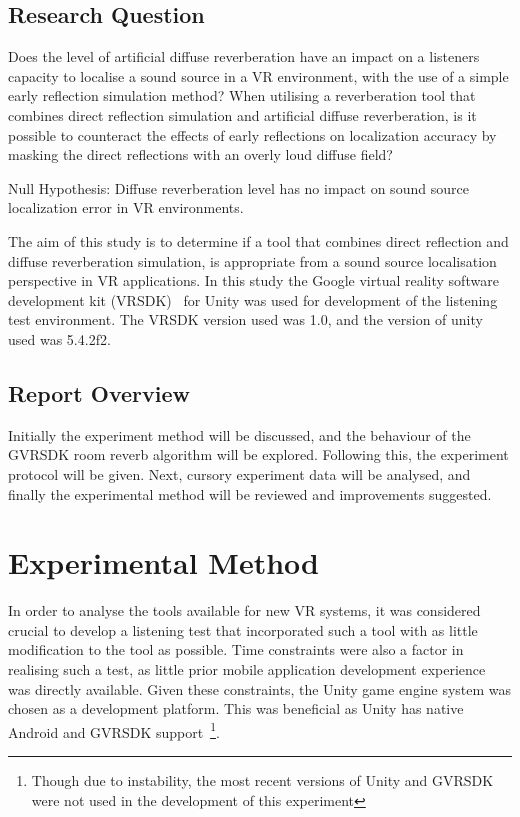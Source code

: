 \documentclass[paper=a4, fontsize=10pt, font=arial]{scrartcl} %
\numberwithin{equation}{section} %
\numberwithin{figure}{section} %
\numberwithin{table}{section} %
\begin{document}
\subsection{Research Question}

Does the level of artificial diffuse reverberation have an impact on a listeners capacity to localise a sound source in a VR environment, with the use of a simple early reflection simulation method? When utilising a reverberation tool that combines direct reflection simulation and artificial diffuse reverberation, is it possible to counteract the effects of early reflections on localization accuracy by masking the direct reflections with an overly loud diffuse field?

Null Hypothesis: Diffuse reverberation level has no impact on sound source localization error in VR environments.

The aim of this study is to determine if a tool that combines direct reflection and diffuse reverberation simulation, is appropriate from a sound source localisation perspective in VR applications. In this study the Google virtual reality software development kit (VRSDK)~\cite{googlevr2016} for Unity was used for development of the listening test environment. The VRSDK version used was 1.0, and the version of unity used was 5.4.2f2.

\subsection{Report Overview}

Initially the experiment method will be discussed, and the behaviour of the GVRSDK room reverb algorithm will be explored. Following this, the experiment protocol will be given. Next, cursory experiment data will be analysed, and finally the experimental method will be reviewed and improvements suggested.


\newpage

\section{Experimental Method}

In order to analyse the tools available for new VR systems, it was considered crucial to develop a listening test that incorporated such a tool with as little modification to the tool as possible. Time constraints were also a factor in realising such a test, as little prior mobile application development experience was directly available. Given these constraints, the Unity game engine system was chosen as a development platform. This was beneficial as Unity has native Android and GVRSDK support~\footnote{Though due to instability, the most recent versions of Unity and GVRSDK were not used in the development of this experiment}.
\end{document}
